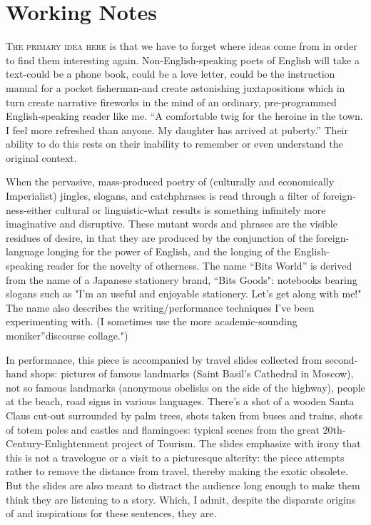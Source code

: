 \documentclass[
]{memoir}
\begin{document}
\hypertarget{working-notes-2}{%
\section*{Working Notes}\label{working-notes-2}}

\lettrine[lines=3, findent=0em, nindent=0.1em, lhang=0]{T}{he primary idea here}
is that we have to forget where ideas come from in order to find them
interesting again. Non-English-speaking poets of English will take a
text-could be a phone book, could be a love letter, could be the
instruction manual for a pocket fisherman-and create astonishing
juxtapositions which in turn create narrative fireworks in the mind of
an ordinary, pre-programmed English-speaking reader like me. ``A
comfortable twig for the heroine in the town. I feel more refreshed than
anyone. My daughter has arrived at puberty.'' Their ability to do this
rests on their inability to remember or even understand the original
context.

When the pervasive, mass-produced poetry of (culturally and economically
Imperialist) jingles, slogans, and catchphrases is read through a filter
of foreign-ness-either cultural or linguistic-what results is something
infinitely more imaginative and disruptive. These mutant words and
phrases are the visible residues of desire, in that they are produced by
the conjunction of the foreign-language longing for the power of
English, and the longing of the English-speaking reader for the novelty
of otherness. The name ``Bits World'' is derived from the name of a
Japanese stationery brand, ``Bits Goods": notebooks bearing slogans such
as "I'm an useful and enjoyable stationery. Let's get along with me!"
The name also describes the writing/performance techniques I've been
experimenting with. (I sometimes use the more academic-sounding
moniker''discourse collage.")

In performance, this piece is accompanied by travel slides collected
from second-hand shops: pictures of famous landmarks (Saint Basil's
Cathedral in Moscow), not so famous landmarks (anonymous obelisks on the
side of the highway), people at the beach, road signs in various
languages. There's a shot of a wooden Santa Claus cut-out surrounded by
palm trees, shots taken from buses and trains, shots of totem poles and
castles and flamingoes: typical scenes from the great
20th-Century-Enlightenment project of Tourism. The slides emphasize with
irony that this is not a travelogue or a visit to a picturesque
alterity: the piece attempts rather to remove the distance from travel,
thereby making the exotic obsolete. But the slides are also meant to
distract the audience long enough to make them think they are listening
to a story. Which, I admit, despite the disparate origins of and
inspirations for these sentences, they are.
\end{document}
